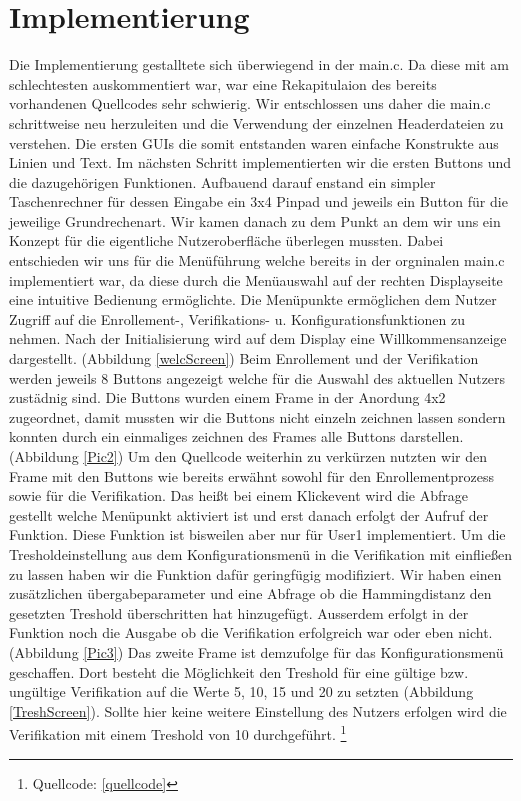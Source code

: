 \section{Implementierung}

Die Implementierung gestalltete sich \"uberwiegend in der main.c. Da diese mit am schlechtesten auskommentiert war, war eine Rekapitulaion des bereits vorhandenen Quellcodes sehr schwierig. Wir entschlossen uns daher die main.c schrittweise neu herzuleiten und die Verwendung der einzelnen Headerdateien zu verstehen. Die ersten GUIs die somit entstanden waren einfache Konstrukte aus Linien und Text. Im n\"achsten Schritt implementierten wir die ersten Buttons und die dazugeh\"origen Funktionen. Aufbauend darauf enstand ein simpler Taschenrechner f\"ur dessen Eingabe ein 3x4 Pinpad und jeweils ein Button f\"ur die jeweilige Grundrechenart. Wir kamen danach zu dem Punkt an dem wir uns ein Konzept f\"ur die eigentliche Nutzeroberfl\"ache \"uberlegen mussten. Dabei entschieden wir uns f\"ur die Men\"uf\"uhrung welche bereits in der orgninalen main.c implementiert war, da diese durch die Men\"uauswahl auf der rechten Displayseite eine intuitive Bedienung erm\"oglichte. Die Men\"upunkte erm\"oglichen dem Nutzer Zugriff auf die Enrollement-, Verifikations- u. Konfigurationsfunktionen zu nehmen. Nach der Initialisierung wird auf dem Display eine Willkommensanzeige dargestellt. (Abbildung \ref{welcScreen}) Beim Enrollement und der Verifikation werden jeweils 8 Buttons angezeigt welche f\"ur die Auswahl des aktuellen Nutzers zust\"adnig sind. Die Buttons wurden einem Frame in der Anordung 4x2 zugeordnet, damit mussten wir die Buttons nicht einzeln zeichnen lassen sondern konnten durch ein einmaliges zeichnen des Frames alle Buttons darstellen. (Abbildung \ref{Pic2}) Um den Quellcode weiterhin zu verk\"urzen nutzten wir den Frame mit den Buttons wie bereits erw\"ahnt sowohl f\"ur den Enrollementprozess sowie f\"ur die Verifikation. Das hei{\ss}t bei einem Klickevent wird die Abfrage gestellt welche Men\"upunkt aktiviert ist und erst danach erfolgt der Aufruf der Funktion. Diese Funktion ist bisweilen aber nur f\"ur User1 implementiert. Um die Tresholdeinstellung aus dem Konfigurationsmen\"u in die Verifikation mit einflie{\ss}en zu lassen haben wir die Funktion daf\"ur geringf\"ugig modifiziert. Wir haben einen zus\"atzlichen \"ubergabeparameter und eine Abfrage ob die Hammingdistanz den gesetzten Treshold \"uberschritten hat hinzugef\"ugt. Ausserdem erfolgt in der Funktion noch die Ausgabe ob die Verifikation erfolgreich war oder eben nicht.(Abbildung \ref{Pic3}) Das zweite Frame ist demzufolge f\"ur das Konfigurationsmen\"u geschaffen. Dort besteht die M\"oglichkeit den Treshold f\"ur eine g\"ultige bzw. ung\"ultige Verifikation auf die Werte 5, 10, 15 und 20 zu setzten (Abbildung \ref{TreshScreen}). Sollte hier keine weitere Einstellung des Nutzers erfolgen wird die Verifikation mit einem Treshold von 10 durchgef\"uhrt. \footnote{\label{foot:1} Quellcode: \ref{quellcode}}

